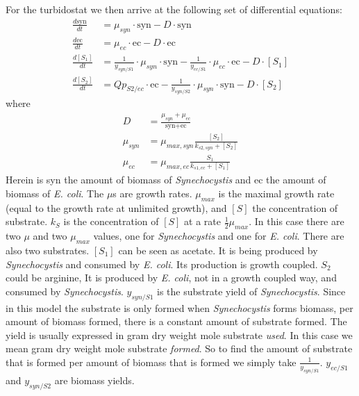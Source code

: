 \documentclass[10pt]{report}
\begin{document}
For the turbidostat we then arrive at the following set of differential equations:
\begin{align} \label{eq:turb}
 \frac{d\text{syn}}{dt} &= \mu_{syn}\cdot\text{syn} - D\cdot\text{syn}\\
 \frac{d\text{ec}}{dt} &= \mu_{ec}\cdot\text{ec} - D\cdot\text{ec} \\
 \frac{d[S_1]}{dt} &= \frac{1}{y_{syn/S1}}\cdot \mu_{syn}\cdot \text{syn} - \frac{1}{y_{ec/S1}}\cdot \mu_{ec}\cdot \text{ec} -D\cdot[S_1]\\
 \frac{d[S_2]}{dt} &=  Qp_{S2/ec}\cdot\text{ec} - \frac{1}{y_{syn/S2}}\cdot \mu_{syn}\cdot \text{syn} -D\cdot[S_2]
\end{align}
where
\begin{align}
 D &= \frac{\mu_{syn} + \mu_{ec}}{\text{syn}+\text{ec}}\\
 \mu_{syn} &= \mu_{max,syn} \frac{[S_2]}{k_{s2,syn}+[S_{2}]}\\
 \mu_{ec} &= \mu_{max,ec} \frac{S_1}{k_{s1,ec}+[S_1]} \label{eq:turbend}
\end{align}
Herein is syn the amount of biomass of \textit{Synechocystis} and ec the amount of biomass of \textit{E. coli}. 
The $\mu$s are growth rates.
$\mu_{max}$ is the maximal growth rate (equal to the growth rate at unlimited growth), and $[S]$ the concentration of substrate. $k_S$ is the concentration of $[S]$ at a rate $\frac{1}{2}\mu_{max}$. In this case there are two $\mu$ and two $\mu_{max}$ values, one for \textit{Synechocystis} and one for \textit{E. coli}. There are also two substrates. $[S_1]$ can be seen as acetate. It is being produced by \textit{Synechocystis} and consumed by \textit{E. coli}. Its production is growth coupled. $S_2$ could be arginine, It is produced by \textit{E. coli}, not in a growth coupled way, and consumed by \textit{Synechocystis}.
$y_{syn/S1}$ is the substrate yield of \textit{Synechocystis}. Since in this model the substrate is only formed when \textit{Synechocystis} forms biomass, per amount of biomass formed, there is a constant amount of substrate formed. The yield is usually expressed in gram dry weight mole substrate \emph{used}. In this case we mean gram dry weight mole substrate \emph{formed}. So to find the amount of substrate that is formed per amount of biomass that is formed we simply take $\frac{1}{y_{syn/S1}}$. $y_{ec/S1}$ and $y_{syn/S2}$ are biomass yields.
\end{document}
